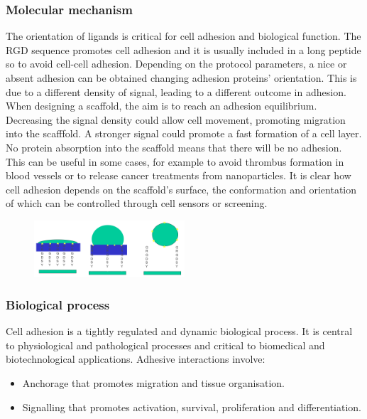 		\subsubsection{Molecular mechanism}
		The orientation of ligands is critical for cell adhesion and biological function.
		The RGD sequence promotes cell adhesion and it is usually included in a long peptide so to avoid cell-cell adhesion.
		Depending on the protocol parameters, a nice or absent adhesion can be obtained changing adhesion proteins' orientation.
		This is due to a different density of signal, leading to a different outcome in adhesion.
		When designing a scaffold, the aim is to reach an adhesion equilibrium.
		Decreasing the signal density could allow cell movement, promoting migration into the scafffold.
		A stronger signal could promote a fast formation of a cell layer.
		No protein absorption into the scaffold means that there will be no adhesion.
		This can be useful in some cases, for example to avoid thrombus formation in blood vessels or to release cancer treatments from nanoparticles.
		It is clear how cell adhesion depends on the scaffold's surface, the conformation and orientation of which can be controlled through cell sensors or screening.

		\begin{figure}[h]
		\centering
		\includegraphics[width=0.5\textwidth]{adhesion}
		\caption{\label{fig:adhesion}}
		\end{figure}

		\subsubsection{Biological process}
		Cell adhesion is a tightly regulated and dynamic biological process.
		It is central to physiological and pathological processes and critical to biomedical and biotechnological applications.
		Adhesive interactions involve:

		\begin{multicols}{2}
			\begin{itemize}
				\item Anchorage that promotes migration and tissue organisation.
				\item Signalling that promotes activation, survival, proliferation and differentiation.
			\end{itemize}
		\end{multicols}

